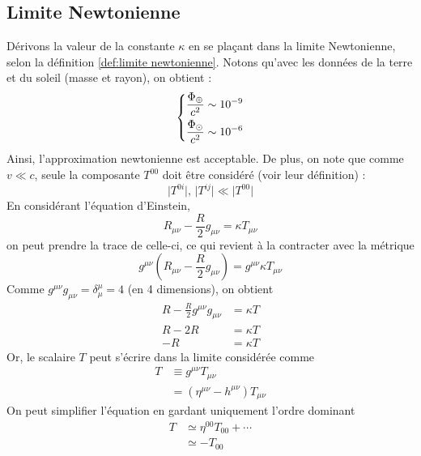 \subsection{Limite Newtonienne}
Dérivons la valeur de la constante $\kappa$ en se plaçant dans la limite Newtonienne, selon la définition \ref{def:limite newtonienne}. Notons qu'avec les données de la terre et du soleil (masse et rayon), on obtient :
\begin{equation}
    \begin{dcases}
        \frac{\Phi_\oplus}{c^2} \sim 10^{-9}\\
        \frac{\Phi_\odot}{c^2} \sim 10^{-6}
    \end{dcases}
\end{equation}
Ainsi, l'approximation newtonienne est acceptable. De plus, on note que comme $v\ll c$, seule la composante $T^{00}$ doit être considéré (voir leur définition) :
\begin{equation}
    \lvert T^{0i}\rvert, \, \lvert T^{ij}\rvert \ll \lvert T^{00}\rvert
\end{equation}
En considérant l'équation d'Einstein, 
\begin{equation}
    R_{\mu \nu} - \frac{R}{2}g_{\mu \nu} = \kappa T_{\mu \nu}
    \label{eq:Einstein pour kappa}
\end{equation}
on peut prendre la trace de celle-ci, ce qui revient à la contracter avec la métrique 
\begin{equation}
    g^{\mu \nu}\left(R_{\mu \nu} - \frac{R}{2}g_{\mu \nu}\right) = g^{\mu \nu}\kappa T_{\mu \nu}
    \label{eq:Einstein pour trouver kappa 1}
\end{equation}
Comme $g^{\mu \nu}g_{\mu \nu} = \delta^{\mu}_{\mu} = 4$ (en 4 dimensions), on obtient
\begin{align}
    R - \frac{R}{2}g^{\mu \nu}g_{\mu \nu} &= \kappa T\\
    R - 2R &= \kappa T\\
     -R &= \kappa T
    \label{eq:Einstein pour trouver kappa 2}
\end{align}
Or, le scalaire $T$ peut s'écrire dans la limite considérée comme
\begin{align}
    T & \equiv g^{\mu \nu}T_{\mu \nu}\\
    &= (\eta^{\mu \nu} - h^{\mu \nu} )T_{\mu \nu}
\end{align} 
On peut simplifier l'équation en gardant uniquement l'ordre dominant
\begin{align}
    T& \simeq \eta^{00}T_{00} + \cdots\\
    &\simeq - T_{00}
\end{align}
